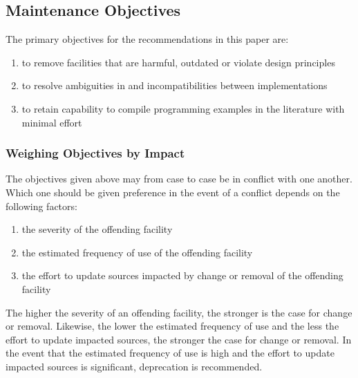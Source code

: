 \documentclass[10pt,a4paper]{article}
\begin{document}
\subsection{Maintenance Objectives}

The primary objectives for the recommendations in this paper are:

\renewcommand{\labelenumi}{(\arabic{enumi})}
\begin{enumerate}[itemindent=-0.75em]
\item to remove facilities that are harmful, outdated or violate design principles
\item to resolve ambiguities in \cite{Wirth88} and incompatibilities between implementations
\item to retain capability to compile programming examples in the literature with minimal effort
\end{enumerate}

\subsubsection{Weighing Objectives by Impact}

\noindent The objectives given above may from case to case be in conflict with
one another. Which one should be given preference in the event of a conflict
depends on the following factors:

\begin{enumerate}[itemindent=-0.75em]
\item the severity of the offending facility
\item the estimated frequency of use of the offending facility
\item the effort to update sources impacted by change or removal of the offending facility
\end{enumerate}

\noindent The higher the severity of an offending facility, the stronger is the
case for change or removal. Likewise, the lower the estimated frequency of use
and the less the effort to update impacted sources, the stronger the case for
change or removal. In the event that the estimated frequency of use is high and
the effort to update impacted sources is significant, deprecation is recommended.


\end{document}
